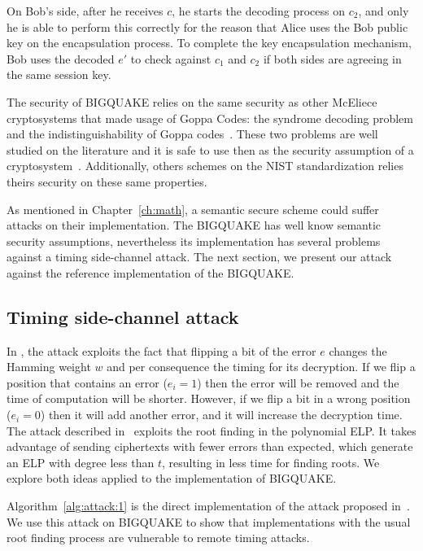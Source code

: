 On Bob's side, after he receives $c$, he starts the decoding process on $c_2$, and only he is able to perform this correctly for the reason that Alice uses the Bob public key on the encapsulation process. To complete the key encapsulation mechanism, Bob uses the decoded $e'$ to check against $c_1$ and $c_2$ if both sides are agreeing in the same session key.

The security of BIGQUAKE relies on the same security as other McEliece cryptosystems that made usage of Goppa Codes: the syndrome decoding problem and the indistinguishability of Goppa codes~\cite{bardet2017big}. These two problems are well studied on the literature and it is safe to use then as the security assumption of a cryptosystem~\cite{bernstein2008attacking, faugere2013distinguisher}. Additionally, others schemes on the NIST standardization relies theirs security on these same properties\cite{bernstein2017classic}.

As mentioned in Chapter~\ref{ch:math}, a semantic secure scheme could suffer attacks on their implementation. The BIGQUAKE has well know semantic security assumptions, nevertheless its implementation has several problems against a timing side-channel attack. The next section, we present our attack against the reference implementation of the BIGQUAKE. 

\subsection{Timing side-channel attack}
In \cite{shoufan2009timing}, the attack exploits the fact that flipping a bit of the error $e$ changes the Hamming weight $w$ and per consequence the timing for its decryption. If we flip a position that contains an error ($e_i = 1$) then the error will be removed and the time of computation will be shorter. However, if we flip a bit in a wrong position ($e_i = 0$) then it will add another error, and it will increase the decryption time. The attack described in~\cite{bucerzan2017improved} exploits the root finding in the polynomial ELP. It takes advantage of sending ciphertexts with fewer errors than expected, which generate an ELP with degree less than $t$, resulting in less time for finding roots. We explore both ideas applied to the implementation of BIGQUAKE.

Algorithm~\ref{alg:attack:1} is the direct implementation of the attack proposed in~\cite{shoufan2009timing}. We use this attack on BIGQUAKE to show that implementations with the usual root finding process are vulnerable to remote timing attacks.

